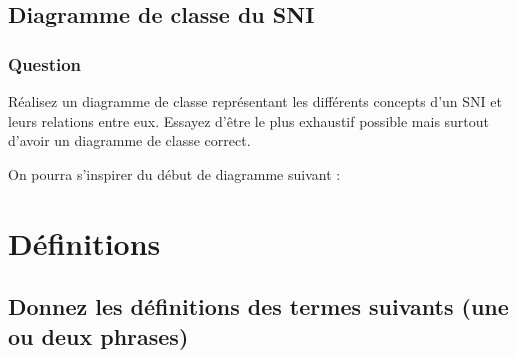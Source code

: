 \documentclass[12pt]{article}
\def\dc{\textsf{diagramme de classe}}
\def\sni{\textsf{SNI}}
\begin{document}
\begin{center}
\fbox{
  \begin{minipage}{6in}
    \hfill\vspace{5in}
  \end{minipage}
}
\end{center}

\subsection{Diagramme de classe du SNI}

\subsubsection*{Question}

Réalisez un \dc{} représentant les différents concepts
d'un \sni{} et leurs relations entre eux.
Essayez d'être le plus exhaustif possible mais surtout d'avoir
un \dc{} correct.

On pourra s'inspirer du début de diagramme suivant :

\begin{center}
\end{center}

\begin{center}
\fbox{
  \begin{minipage}{6in}
    \hfill\vspace{5in}
  \end{minipage}
}
\end{center}

\section{Définitions}

\subsection*{Donnez les définitions des termes suivants (une ou deux phrases)}
\end{document}
